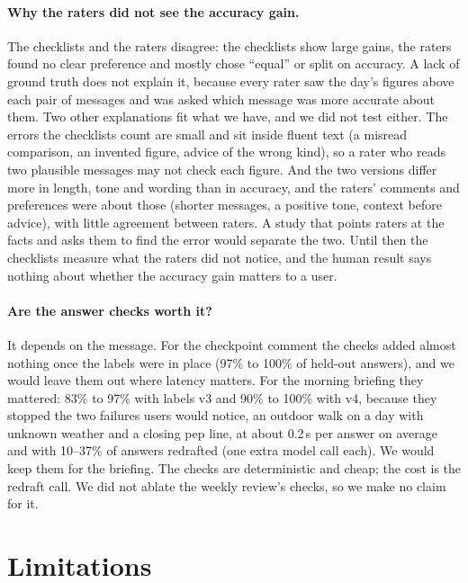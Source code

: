 \documentclass[10pt,twocolumn]{article}
\begin{document}
\paragraph{Why the raters did not see the accuracy gain.} The checklists and the raters disagree: the checklists show
large gains, the raters found no clear preference and mostly chose ``equal'' or split on accuracy. A lack of ground truth
does not explain it, because every rater saw the day's figures above each pair of messages and was asked which message was
more accurate about them. Two other explanations fit what we have, and we did not test either. The errors the checklists
count are small and sit inside fluent text (a misread comparison, an invented figure, advice of the wrong kind), so a
rater who reads two plausible messages may not check each figure. And the two versions differ more in length, tone and
wording than in accuracy, and the raters' comments and preferences were about those (shorter messages, a positive tone,
context before advice), with little agreement between raters. A study that points raters at the facts and asks them to
find the error would separate the two. Until then the checklists measure what the raters did not notice, and the
human result says nothing about whether the accuracy gain matters to a user.

\paragraph{Are the answer checks worth it?} It depends on the message. For the checkpoint comment the checks added
almost nothing once the labels were in place (97\% to 100\% of held-out answers), and we would leave them out where
latency matters. For the morning briefing they mattered: 83\% to 97\% with labels v3 and 90\% to 100\% with v4, because
they stopped the two failures users would notice, an outdoor walk on a day with unknown weather and a closing pep line,
at about 0.2\,s per answer on average and with 10--37\% of answers redrafted (one extra model call each). We would keep
them for the briefing. The checks are deterministic and cheap; the cost is the redraft call. We did not ablate the weekly
review's checks, so we make no claim for it.

\section{Limitations}
\label{sec:limitations}
\end{document}
